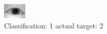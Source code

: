 \begin{figure}[h!]
\begin{center}
\includegraphics[width=0.60\columnwidth]{figures/ID910_class_1_target_2.png}
\end{center}
\caption{ Classification: 1 actual target: 2}
\label{fig:ID910_class_1_target_2}
\end{figure}

